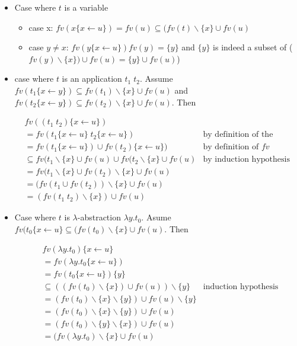   \begin{itemize}
    \item Case where $t$ is a variable
      \begin{itemize}
        \item case x: $fv(x\{x\leftarrow u\}) = fv(u) \subseteq (fv(t)
          \backslash \{x\} \cup fv(u)$
        \item case $y\not =x$: $fv(y\{x\leftarrow u\} ) fv(y) = \{y\}$ and
          $\{y\}$ is indeed a subset of ($fv(y)\backslash \{x\}) \cup fv(u) =
          \{y\} \cup fv(u)$)
      \end{itemize}

    \item case where $t$ is an application $t_1\;t_2$. Assume
      $fv(t_1\{x\leftarrow y\})\subseteq fv(t_1) \backslash \{x\} \cup fv(u)$ and
      $fv(t_2\{x\leftarrow y\})\subseteq fv(t_2) \backslash \{x\} \cup fv(u)$.
      Then

      \begin{align*}
        &fv((t_1\;t_2)\{x \leftarrow u\}) \\
        &= fv(t_1\{x \leftarrow u\}\; t_2\{x \leftarrow u\}) & \text{by
        definition of the substitution} \\
        &= fv(t_1\{x \leftarrow u\}) \cup fv(t_2)\{x \leftarrow u\}) & \text{by
        definition of $fv$} \\
        &\subseteq fv(t_1 \backslash \{x\} \cup fv(u) \cup
        fv(t_2 \backslash \{x\} \cup fv(u) & \text{by induction hypothesis} \\
        &=fv(t_1 \backslash \{x\} \cup fv(t_2) \backslash \{x\}
        \cup fv(u) \\
        &=(fv(t_1 \cup fv(t_2)) \backslash \{x\}
        \cup fv(u) \\
        &= (fv(t_1\;t_2) \backslash \{x\}) \cup fv(u)
      \end{align*}

    \item Case where $t$ is $\lambda$-abstraction $\lambda y.t_0$. Asume
      $fv(t_0\{x\leftarrow u\} \subseteq (fv(t_0) \backslash \{x\} \cup fv(u)$.
      Then

      \begin{align*}
        &fv(\lambda y.t_0)\{x \leftarrow u\} \\
        &= fv(\lambda y.t_0\{x \leftarrow u\}) \\
        &= fv(t_0\{x \leftarrow u\})\{y\} \\
        &\subseteq ((fv(t_0) \backslash\{x\})\cup fv(u))\backslash \{y\} &
        \text{induction hypothesis} \\
        &= (fv(t_0) \backslash\{x\} \backslash \{y\})\cup fv(u)\backslash \{y\}
        \\
        &= (fv(t_0) \backslash\{x\} \backslash \{y\})\cup fv(u) \\
        &= (fv(t_0) \backslash \{y\} \backslash\{x\})\cup fv(u) \\
        &= (fv(\lambda y.t_0) \backslash \{x\} \cup fv(u) \\
      \end{align*}
  \end{itemize}
  \qedsymbol

